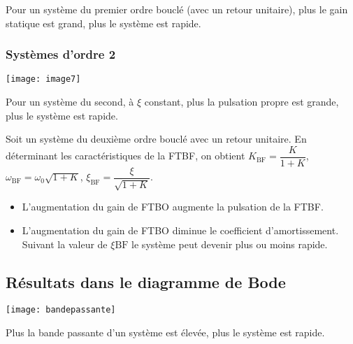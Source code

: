 \begin{resultat}
Pour un système du premier ordre bouclé (avec un retour unitaire), plus le gain statique est grand, plus le système est rapide. 
\end{resultat}

\subsubsection{Systèmes d'ordre 2}
\begin{marginfigure}
\centering
\texttt{[image: image7]}
\end{marginfigure}

\begin{resultat}
Pour un système du second, à $\xi$ constant, plus la pulsation propre est grande, plus le système est rapide. 
\end{resultat} 


Soit un système du deuxième ordre bouclé avec un retour unitaire. En déterminant les caractéristiques de la FTBF, on obtient $K_{\text{BF}}=\dfrac{K}{1+K}$, $\omega_{\text{BF}}=\omega_0\sqrt{1+K}$, $\xi_{\text{BF}}=\dfrac{\xi}{\sqrt{1+K}}$.



\begin{resultat}
\begin{itemize}
\item L'augmentation du gain de FTBO augmente la pulsation de la FTBF. 
\item L'augmentation du gain de FTBO diminue le coefficient d'amortissement. Suivant la valeur de $\xi{\text{BF}}$ le système peut devenir plus ou moins rapide.  
\end{itemize}
\end{resultat}



\subsection{Résultats dans le diagramme de Bode}


\begin{marginfigure}
\centering
\texttt{[image: bandepassante]}
\end{marginfigure}

\begin{resultat}
Plus la bande passante d'un système est élevée, plus le système est rapide.
\end{resultat}


